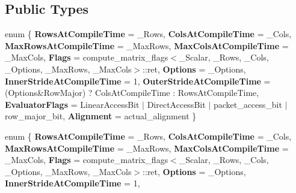\subsection*{Public Types}
\begin{DoxyCompactItemize}
\item 
\mbox{\label{struct_eigen_1_1internal_1_1traits_3_01_matrix_3_01___scalar_00_01___rows_00_01___cols_00_01___o4c9772ffb3eee7280611af9a479b3583_a3ac0510a8558c8c30f88a639aa734944}} 
enum \{ \newline
{\bfseries Rows\+At\+Compile\+Time} = \+\_\+\+Rows, 
{\bfseries Cols\+At\+Compile\+Time} = \+\_\+\+Cols, 
{\bfseries Max\+Rows\+At\+Compile\+Time} = \+\_\+\+Max\+Rows, 
{\bfseries Max\+Cols\+At\+Compile\+Time} = \+\_\+\+Max\+Cols, 
\newline
{\bfseries Flags} = compute\+\_\+matrix\+\_\+flags$<$\+\_\+\+Scalar, \+\_\+\+Rows, \+\_\+\+Cols, \+\_\+\+Options, \+\_\+\+Max\+Rows, \+\_\+\+Max\+Cols$>$\+:\+:ret, 
{\bfseries Options} = \+\_\+\+Options, 
{\bfseries Inner\+Stride\+At\+Compile\+Time} = 1, 
{\bfseries Outer\+Stride\+At\+Compile\+Time} = (Options\&Row\+Major) ? Cols\+At\+Compile\+Time \+: Rows\+At\+Compile\+Time, 
\newline
{\bfseries Evaluator\+Flags} = Linear\+Access\+Bit $\vert$ Direct\+Access\+Bit $\vert$ packet\+\_\+access\+\_\+bit $\vert$ row\+\_\+major\+\_\+bit, 
{\bfseries Alignment} = actual\+\_\+alignment
 \}
\item 
\mbox{\label{struct_eigen_1_1internal_1_1traits_3_01_matrix_3_01___scalar_00_01___rows_00_01___cols_00_01___o4c9772ffb3eee7280611af9a479b3583_a925ed2cc1cc41158a5c5eca97cc2a010}} 
enum \{ \newline
{\bfseries Rows\+At\+Compile\+Time} = \+\_\+\+Rows, 
{\bfseries Cols\+At\+Compile\+Time} = \+\_\+\+Cols, 
{\bfseries Max\+Rows\+At\+Compile\+Time} = \+\_\+\+Max\+Rows, 
{\bfseries Max\+Cols\+At\+Compile\+Time} = \+\_\+\+Max\+Cols, 
\newline
{\bfseries Flags} = compute\+\_\+matrix\+\_\+flags$<$\+\_\+\+Scalar, \+\_\+\+Rows, \+\_\+\+Cols, \+\_\+\+Options, \+\_\+\+Max\+Rows, \+\_\+\+Max\+Cols$>$\+:\+:ret, 
{\bfseries Options} = \+\_\+\+Options, 
{\bfseries Inner\+Stride\+At\+Compile\+Time} = 1, 

\end{DoxyCompactItemize}
